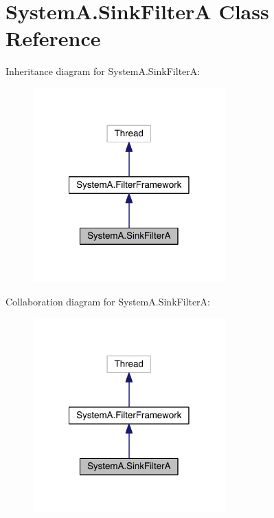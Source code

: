 \hypertarget{class_system_a_1_1_sink_filter_a}{}\section{System\+A.\+Sink\+Filter\+A Class Reference}
\label{class_system_a_1_1_sink_filter_a}


Inheritance diagram for System\+A.\+Sink\+Filter\+A\+:\nopagebreak
\begin{figure}[H]
\begin{center}
\leavevmode
\includegraphics[width=210pt]{class_system_a_1_1_sink_filter_a__inherit__graph}
\end{center}
\end{figure}


Collaboration diagram for System\+A.\+Sink\+Filter\+A\+:\nopagebreak
\begin{figure}[H]
\begin{center}
\leavevmode
\includegraphics[width=210pt]{class_system_a_1_1_sink_filter_a__coll__graph}
\end{center}
\end{figure}
